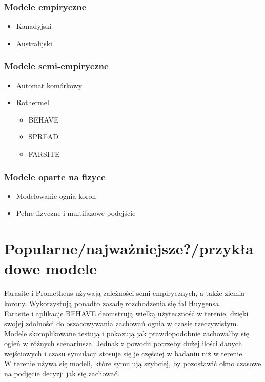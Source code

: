 \documentclass[a4paper, 11pt]{article}
\begin{document}
	\subsubsection*{Modele empiryczne}
	\begin{itemize}
	\item Kanadyjski
	\item Australijski
	\end{itemize}
	\subsubsection*{Modele semi-empiryczne}
	\begin{itemize}
	\item Automat komórkowy
	\item Rothermel
		\begin{itemize}
		\item BEHAVE
		\item SPREAD
		\item FARSITE
		\end{itemize}
	\end{itemize}
	\subsubsection*{Modele oparte na fizyce}
	\begin{itemize}
	\item Modelowanie ognia koron 
	\item Pełne fizyczne i multifazowe podejście
	\end{itemize}
	\section* {Popularne/najważniejsze?/przykładowe modele}
	
	Farasite i Prometheus używają zależności semi-empirycznych, a także ziemia-korony. Wykorzystują ponadto zasadę rozchodzenia się fal Huygensa.	\\
	Farasite i aplikacje BEHAVE deomstrują wielką użyteczność w terenie, dzięki swojej zdolności do oszacowywania zachowań ognia w czasie rzeczywistym.\\
	Modele skomplikowane testują i pokazują jak prawdopodobnie zachowałby się ogień w różnych scenariusza. Jednak z powodu potrzeby dużej ilości danych wejściowych i czasu symulacji stosuje się je częściej w badaniu niż w terenie. \\
	W terenie używa się modeli, które symulują szybciej, by pozostawić okno czasowe na podjęcie decyzji jak się zachować. 
	
\end{document}
